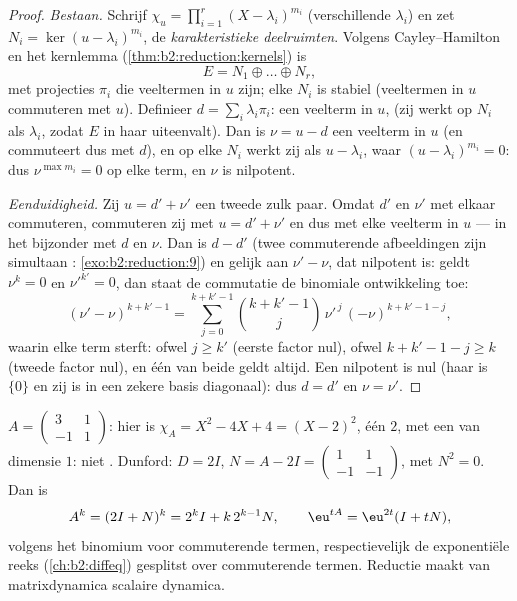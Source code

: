 \begin{proof}
\emph{Bestaan.} Schrijf $\chi_u = \prod_{i=1}^{r} (X -
\lambda_i)^{m_i}$ (verschillende $\lambda_i$) en zet $N_i = \ker(u
- \lambda_i)^{m_i}$, de \emph{karakteristieke deelruimten}. Volgens
Cayley--Hamilton en het kernlemma
(\cref{thm:b2:reduction:kernels}) is
\[
E = N_1 \oplus \dots \oplus N_r ,
\]
met projecties $\pi_i$ die veeltermen in $u$ zijn; elke $N_i$ is
stabiel (veeltermen in $u$ commuteren met $u$). Definieer $d =
\sum_i \lambda_i \pi_i$: een veelterm in $u$, 
(zij werkt op $N_i$ als $\lambda_i$, zodat $E$ in haar 
uiteenvalt). Dan is $\nu = u - d$ een veelterm in $u$ (en
commuteert dus met $d$), en op elke $N_i$ werkt zij als $u -
\lambda_i$, waar $(u - \lambda_i)^{m_i} = 0$: dus $\nu^{\max m_i} =
0$ op elke term, en $\nu$ is nilpotent.

\emph{Eenduidigheid.} Zij $u = d' + \nu'$ een tweede zulk paar.
Omdat $d'$ en $\nu'$ met elkaar commuteren, commuteren zij met $u =
d' + \nu'$ en dus met elke veelterm in $u$ --- in het bijzonder met
$d$ en $\nu$. Dan is $d - d'$  (twee commuterende
 afbeeldingen zijn simultaan :
\cref{exo:b2:reduction:9}) en gelijk aan $\nu' - \nu$, dat
nilpotent is: geldt $\nu^k = 0$ en $\nu'^{k'} = 0$, dan staat de
commutatie de binomiale ontwikkeling toe:
\[
(\nu' - \nu)^{k + k' - 1}
= \sum_{j=0}^{k+k'-1}\binom{k + k' - 1}{j}
\,\nu'^{\,j}\,(-\nu)^{k + k' - 1 - j} ,
\]
waarin elke term sterft: ofwel $j \geq k'$ (eerste factor nul),
ofwel $k + k' - 1 - j \geq k$ (tweede factor nul), en één van beide
geldt altijd. Een  nilpotent is nul (haar 
is $\{0\}$ en zij is in een zekere basis diagonaal): dus $d = d'$
en $\nu = \nu'$.
\end{proof}

\begin{example}\label{ex:b2:reduction:powers}
$A = \begin{pmatrix} 3 & 1\\ -1 & 1\end{pmatrix}$: hier is $\chi_A
= X^2 - 4X + 4 = (X-2)^2$, één  $2$, met een 
van dimensie $1$: niet . Dunford: $D = 2I$, $N = A
- 2I = \begin{pmatrix} 1 & 1\\ -1 & -1\end{pmatrix}$, met $N^2 =
0$. Dan is
\[
A^k = (2I + N)^k = 2^k I + k\,2^{k-1} N ,
\qquad
\eu^{tA} = \eu^{2t}(I + tN),
\]
volgens het binomium voor commuterende termen, respectievelijk de
exponentiële reeks (\cref{ch:b2:diffeq}) gesplitst over
commuterende termen. Reductie maakt van matrixdynamica scalaire
dynamica.
\end{example}

